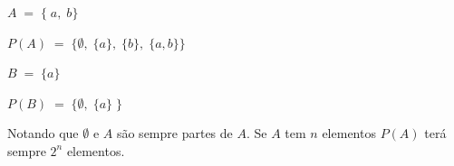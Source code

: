 \begin{example}
	
	$ A \; = \; \{ \; a, \; b \} $
	
	$ P(A) \; = \; \{ \emptyset, \; \{ a \}, \; \{ b \}, \; \{ a, b \} \} $ 
	
	$ B \; = \; \{ a \} $ 
	
	$P(B) \; = \; \{ \emptyset, \; \{ a \} \;\} $

\end{example}

Notando que $\emptyset$ e $A$ são sempre partes de $A$. Se $A$ tem $n$ elementos $P(A)$ terá sempre $2^{n}$ elementos.